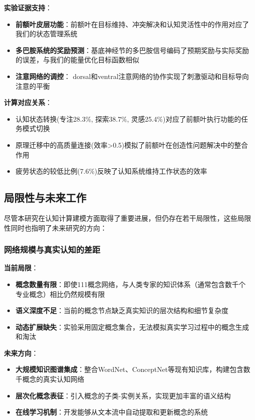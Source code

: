 \documentclass[12pt,a4paper]{article}
\begin{document}
\textbf{实验证据支持}：
\begin{itemize}
\item \textbf{前额叶皮层功能}：前额叶在目标维持、冲突解决和认知灵活性中的作用对应了我们的状态管理系统
\item \textbf{多巴胺系统的奖励预测}：基底神经节的多巴胺信号编码了预期奖励与实际奖励的误差，与我们的能量优化目标函数相似
\item \textbf{注意网络的调控}： dorsal和ventral注意网络的协作实现了刺激驱动和目标导向注意的平衡
\end{itemize}

\textbf{计算对应关系}：
\begin{itemize}
\item 认知状态转换(专注28.3\%, 探索38.7\%, 灵感25.4\%)对应了前额叶执行功能的任务模式切换
\item 原理迁移中的高质量连接(效率>0.5)模拟了前额叶在创造性问题解决中的整合作用
\item 疲劳状态的较低比例(7.6\%)反映了认知系统维持工作状态的效率
\end{itemize}

\subsection{局限性与未来工作}

尽管本研究在认知计算建模方面取得了重要进展，但仍存在若干局限性，这些局限性同时也指明了未来研究的方向：

\subsubsection{网络规模与真实认知的差距}

\textbf{当前局限}：
\begin{itemize}
\item \textbf{概念数量有限}：即使111概念网络，与人类专家的知识体系（通常包含数千个专业概念）相比仍然规模有限
\item \textbf{语义深度不足}：当前的概念节点缺乏真实知识的层次结构和细节复杂度
\item \textbf{动态扩展缺失}：实验采用固定概念集合，无法模拟真实学习过程中的概念生成和淘汰
\end{itemize}

\textbf{未来方向}：
\begin{itemize}
\item \textbf{大规模知识图谱集成}：整合WordNet、ConceptNet等现有知识库，构建包含数千概念的真实认知网络
\item \textbf{层次化概念表征}：引入概念的子类-实例关系，实现更加丰富的语义结构
\item \textbf{在线学习机制}：开发能够从文本流中自动提取和更新概念的系统
\end{itemize}
\end{document}
